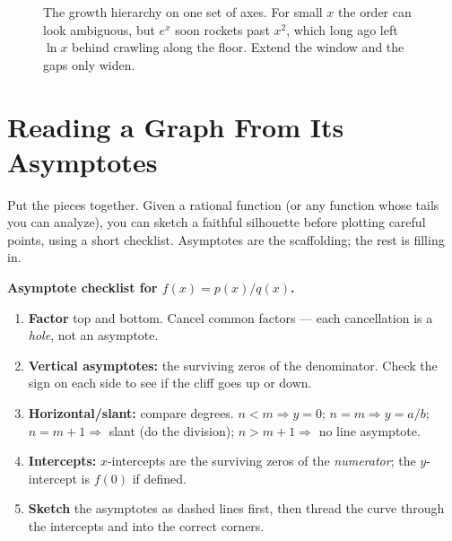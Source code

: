 \begin{figure}[H]
\centering
{}
\caption{The growth hierarchy on one set of axes. For small $x$ the order can
look ambiguous, but $e^x$ soon rockets past $x^2$, which long ago left $\ln x$
behind crawling along the floor. Extend the window and the gaps only widen.}
\label{ch09:fig-hierarchy}
\end{figure}

\section{Reading a Graph From Its Asymptotes}
\label{ch09:reading}

Put the pieces together. Given a rational function (or any function whose tails
you can analyze), you can sketch a faithful silhouette before plotting careful
points, using a short checklist. Asymptotes are the scaffolding; the rest is
filling in.

\begin{focusbox}
\textbf{Asymptote checklist for $f(x)=p(x)/q(x)$.}
\begin{enumerate}
\item \textbf{Factor} top and bottom. Cancel common factors --- each cancellation
is a \emph{hole}, not an asymptote.
\item \textbf{Vertical asymptotes:} the surviving zeros of the denominator. Check
the sign on each side to see if the cliff goes up or down.
\item \textbf{Horizontal/slant:} compare degrees. $n<m\Rightarrow y=0$;
$n=m\Rightarrow y=a/b$; $n=m+1\Rightarrow$ slant (do the division); $n>m+1
\Rightarrow$ no line asymptote.
\item \textbf{Intercepts:} $x$-intercepts are the surviving zeros of the
\emph{numerator}; the $y$-intercept is $f(0)$ if defined.
\item \textbf{Sketch} the asymptotes as dashed lines first, then thread the curve
through the intercepts and into the correct corners.
\end{enumerate}
\end{focusbox}

